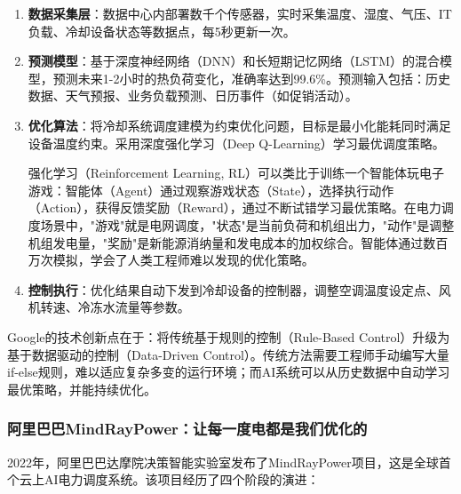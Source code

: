\begin{enumerate}
    \item \textbf{数据采集层}：数据中心内部署数千个传感器，实时采集温度、湿度、气压、IT负载、冷却设备状态等数据点，每5秒更新一次。

    \item \textbf{预测模型}：基于深度神经网络（DNN）和长短期记忆网络（LSTM）的混合模型，预测未来1-2小时的热负荷变化，准确率达到99.6\%。预测输入包括：历史数据、天气预报、业务负载预测、日历事件（如促销活动）。

    \item \textbf{优化算法}：将冷却系统调度建模为约束优化问题，目标是最小化能耗同时满足设备温度约束。采用深度强化学习（Deep Q-Learning）学习最优调度策略。

\begin{analogy}
强化学习（Reinforcement Learning, RL）可以类比于训练一个智能体玩电子游戏：智能体（Agent）通过观察游戏状态（State），选择执行动作（Action），获得反馈奖励（Reward），通过不断试错学习最优策略。在电力调度场景中，"游戏"就是电网调度，"状态"是当前负荷和机组出力，"动作"是调整机组发电量，"奖励"是新能源消纳量和发电成本的加权综合。智能体通过数百万次模拟，学会了人类工程师难以发现的优化策略。
\end{analogy}

    \item \textbf{控制执行}：优化结果自动下发到冷却设备的控制器，调整空调温度设定点、风机转速、冷冻水流量等参数。
\end{enumerate}

Google的技术创新点在于：将传统基于规则的控制（Rule-Based Control）升级为基于数据驱动的控制（Data-Driven Control）。传统方法需要工程师手动编写大量if-else规则，难以适应复杂多变的运行环境；而AI系统可以从历史数据中自动学习最优策略，并能持续优化。

\subsubsection{阿里巴巴MindRayPower：让每一度电都是我们优化的}

2022年，阿里巴巴达摩院决策智能实验室发布了MindRayPower项目，这是全球首个云上AI电力调度系统。该项目经历了四个阶段的演进：

